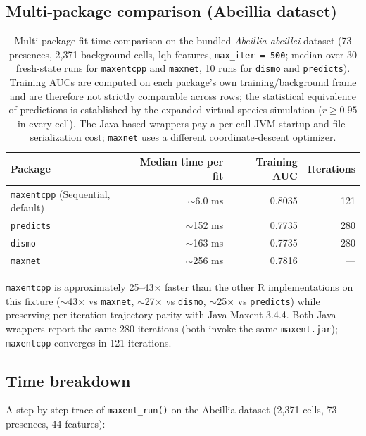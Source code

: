 \subsection{Multi-package comparison (Abeillia dataset)}

\begin{table}[h]
\centering
\small
\begin{tabular}{lrrr}
\toprule
\textbf{Package} & \textbf{Median time per fit} & \textbf{Training AUC} & \textbf{Iterations} \\
\midrule
\texttt{maxentcpp} (Sequential, default) & $\sim$6.0 ms & 0.8035 & 121 \\
\texttt{predicts} & $\sim$152 ms & 0.7735 & 280 \\
\texttt{dismo} & $\sim$163 ms & 0.7735 & 280 \\
\texttt{maxnet} & $\sim$256 ms & 0.7816 & --- \\
\bottomrule
\end{tabular}
\caption{Multi-package fit-time comparison on the bundled \emph{Abeillia
abeillei} dataset (73 presences, 2,371 background cells, lqh features,
\texttt{max\_iter = 500}; median over 30 fresh-state runs for
\texttt{maxentcpp} and \texttt{maxnet}, 10 runs for \texttt{dismo} and
\texttt{predicts}).  Training AUCs are computed on each package's own
training/background frame and are therefore not strictly comparable
across rows; the statistical equivalence of predictions is established
by the expanded virtual-species simulation ($r \ge 0.95$ in every
cell).  The Java-based wrappers pay a per-call JVM startup and
file-serialization cost; \texttt{maxnet} uses a different
coordinate-descent optimizer.}
\label{tab:multipkg}
\end{table}

\texttt{maxentcpp} is approximately 25--43$\times$ faster than the
other R implementations on this fixture ($\sim$43$\times$ vs
\texttt{maxnet}, $\sim$27$\times$ vs \texttt{dismo}, $\sim$25$\times$ vs
\texttt{predicts}) while preserving per-iteration trajectory parity with
Java Maxent 3.4.4.  Both Java wrappers report the same 280 iterations
(both invoke the same \texttt{maxent.jar}); \texttt{maxentcpp}
converges in 121 iterations.

\subsection{Time breakdown}
\label{sec:breakdown}

A step-by-step trace of \texttt{maxent\_run()} on the Abeillia dataset
(2,371 cells, 73 presences, 44 features):

